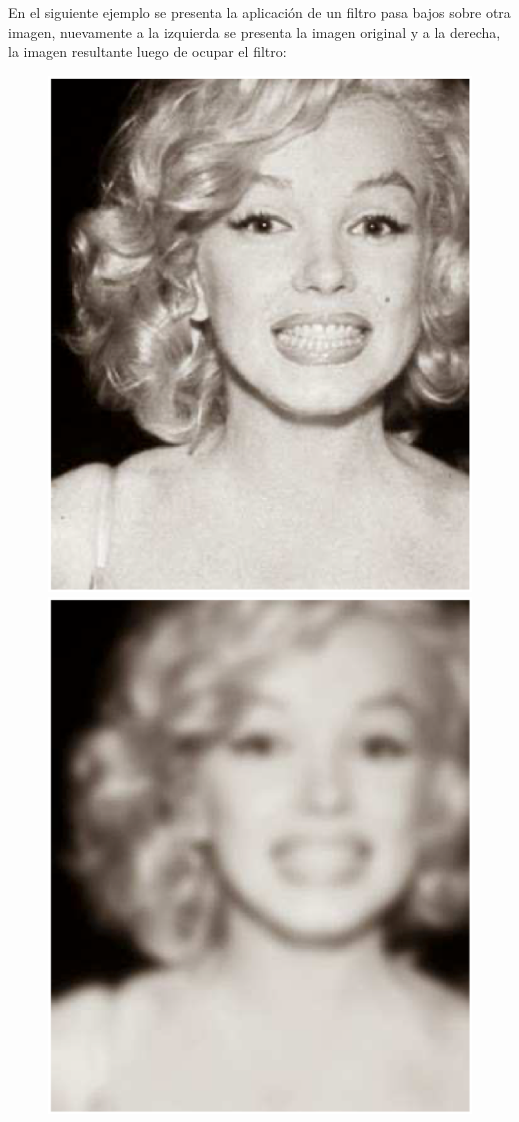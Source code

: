 En el siguiente ejemplo se presenta la aplicación de un filtro pasa bajos sobre otra imagen, nuevamente a la izquierda se presenta la imagen original y a la derecha, la imagen resultante luego de ocupar el filtro:
\begin{figure}
    \centering
    \includegraphics[scale=0.35]{Imagenes/Marylin_01.eps}
    \includegraphics[scale=0.35]{Imagenes/Marylin_02.eps}

\end{figure}
